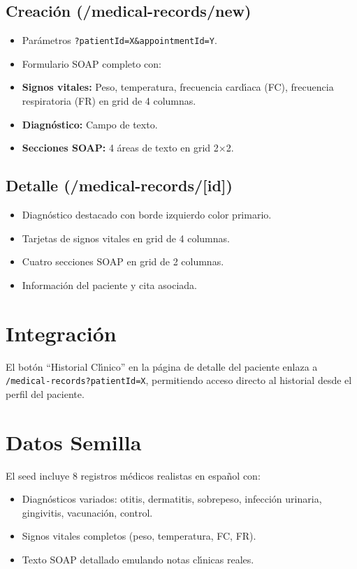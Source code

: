 \subsection{Creaci\'on (/medical-records/new)}

\begin{itemize}[leftmargin=*]
    \item Par\'ametros \texttt{?patientId=X\&appointmentId=Y}.
    \item Formulario SOAP completo con:
    \item \textbf{Signos vitales:} Peso, temperatura, frecuencia card\'{\i}aca
          (FC), frecuencia respiratoria (FR) en grid de 4 columnas.
    \item \textbf{Diagn\'ostico:} Campo de texto.
    \item \textbf{Secciones SOAP:} 4 \'areas de texto en grid 2$\times$2.
\end{itemize}

\subsection{Detalle (/medical-records/[id])}

\begin{itemize}[leftmargin=*]
    \item Diagn\'ostico destacado con borde izquierdo color primario.
    \item Tarjetas de signos vitales en grid de 4 columnas.
    \item Cuatro secciones SOAP en grid de 2 columnas.
    \item Informaci\'on del paciente y cita asociada.
\end{itemize}

\section{Integraci\'on}

El bot\'on ``Historial Cl\'{\i}nico'' en la p\'agina de detalle del
paciente enlaza a \texttt{/medical-records?patientId=X}, permitiendo
acceso directo al historial desde el perfil del paciente.

\section{Datos Semilla}

El seed incluye 8 registros m\'edicos realistas en espa\~nol con:

\begin{itemize}[leftmargin=*]
    \item Diagn\'osticos variados: otitis, dermatitis, sobrepeso, infecci\'on
          urinaria, gingivitis, vacunaci\'on, control.
    \item Signos vitales completos (peso, temperatura, FC, FR).
    \item Texto SOAP detallado emulando notas cl\'{\i}nicas reales.
\end{itemize}
